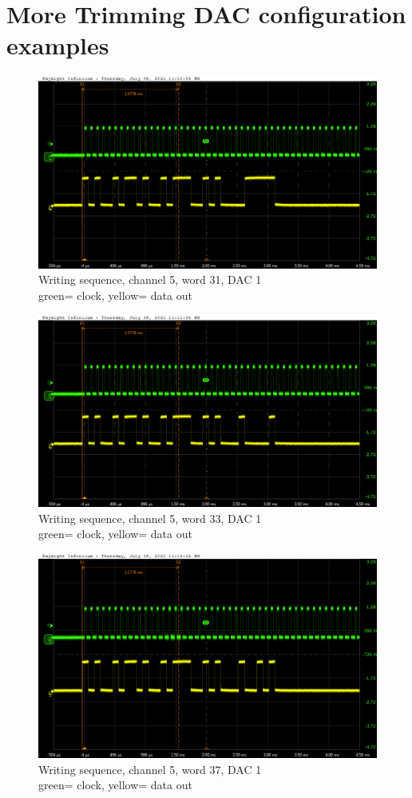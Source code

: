 \appendix
\chapter{More Trimming DAC configuration examples}\label{DacAppendix}

\begin{figure}[H]
	\centering
	\includegraphics[width=0.6\linewidth]{IMG/ch5/probe/09-08-2021_ch05-write31-baselinedac1}
	\caption{Writing sequence, channel 5, word 31, DAC 1\\{\color{green}green}= clock, {\color{yellow}yellow}= data out}
	\label{fig:ch05write31}
\end{figure}

\begin{figure}[H]
	\centering
	\includegraphics[width=0.6\linewidth]{IMG/ch5/probe/09-08-2021_ch05-write33-baselinedac1}
	\caption{Writing sequence, channel 5, word 33, DAC 1\\{\color{green}green}= clock, {\color{yellow}yellow}= data out}
	\label{fig:ch05write33}
\end{figure}

\begin{figure}[H]
	\centering
	\includegraphics[width=0.6\linewidth]{IMG/ch5/probe/09-08-2021_ch05-write37-baselinedac1}
	\caption{Writing sequence, channel 5, word 37, DAC 1\\{\color{green}green}= clock, {\color{yellow}yellow}= data out}
	\label{fig:ch05write37}
\end{figure}

